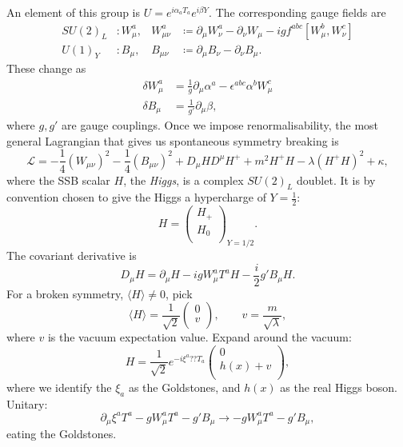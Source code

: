 An element of this group is $U = e^{i \alpha_a T_a} e^{i \beta Y}$.
The corresponding gauge fields are
\begin{align}
  SU(2)_L &\colon W_{\mu}^{a}, & W^{a}_{\mu\nu} &\coloneqq \partial_{\mu} W^{a}_{\nu} - \partial_{\nu} W_{\mu} - i g f^{abc} [W^{b}_{\mu}, W^{c}_{\nu}] \\
  U(1)_Y &\colon B_{\mu}, & B_{\mu\nu} &\coloneqq \partial_{\mu} B_{\nu} - \partial_{\nu} B_{\mu}.
\end{align}
These change as
\begin{align}
  \delta W^{a}_{\mu} &= \frac{1}{g} \partial_{\mu} \alpha^{a} - \epsilon^{abc} \alpha^{b} W^{c}_{\mu} \\
  \delta B_{\mu} &= \frac{1}{g'} \partial_{\mu} \beta,
\end{align}
where $g, g'$ are gauge couplings.
Once we impose renormalisability, the most general Lagrangian that gives us spontaneous symmetry breaking is
\begin{equation}
  \mathscr{L} = -\frac{1}{4} (W_{\mu\nu})^2 - \frac{1}{4} (B_{\mu\nu})^2 + D_{\mu} H D^{\mu} H^+ + m^2 H^+ H - \lambda (H^+ H)^2 + \kappa,
\end{equation}
where the SSB scalar $H$, the \emph{Higgs}, is a complex $SU(2)_L$ doublet.
It is by convention chosen to give the Higgs a hypercharge of $Y = \frac{1}{2}$:
\begin{equation}
  H = 
  \begin{pmatrix}
  H_+ \\
  H_0 \\
  \end{pmatrix}_{Y = 1 / 2}.
\end{equation}
The covariant derivative is
\begin{equation}
  D_{\mu} H = \partial_{\mu} H - i g W^{a}_{\mu} T^{a} H - \frac{i}{2} g' B_{\mu} H.
\end{equation}
For a broken symmetry, $\langle H \rangle \neq 0$, pick
\begin{equation}
  \langle H \rangle = \frac{1}{\sqrt{2}} 
  \begin{pmatrix}
  0 \\
  v \\
  \end{pmatrix}
  , \qquad v = \frac{m}{\sqrt{\lambda}},
\end{equation}
where $v$ is the vacuum expectation value.
Expand around the vacuum:
\begin{equation}
  H = \frac{1}{\sqrt{2}} e^{-i \xi^{a} ?? T_a}
  \begin{pmatrix}
  0 \\
  h(x) + v \\
  \end{pmatrix},
\end{equation}
where we identify the $\xi_{a}$ as the Goldstones, and $h(x)$ as the real Higgs boson.
Unitary:
\begin{equation}
  \partial_{\mu} \xi^{a} T^{a} - g W^{a}_{\mu} T^{a} - g' B_{\mu}  \to -g W_{\mu}^{a} T^{a} - g'B_{\mu},
\end{equation}
eating the Goldstones.
